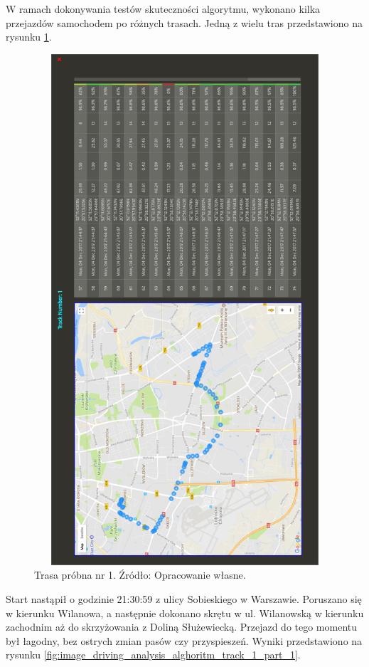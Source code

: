 W ramach dokonywania testów skuteczności algorytmu, wykonano kilka przejazdów samochodem po różnych trasach. Jedną z wielu tras przedstawiono na rysunku \ref{fig:image_driving_analysis_alghoritm_track_1}.

\begin{figure}[H]
	\centering
	\includegraphics[height=19cm, width=13cm]{img/driving_analysis/test_track_1.png}
	\caption{Trasa próbna nr 1. Źródło: Opracowanie własne.}
	\label{fig:image_driving_analysis_alghoritm_track_1}
\end{figure}

Start nastąpił o godzinie 21:30:59 z ulicy Sobieskiego w Warszawie. Poruszano się w kierunku Wilanowa, a następnie dokonano skrętu w ul. Wilanowską w kierunku zachodnim aż do skrzyżowania z Doliną Służewiecką. Przejazd do tego momentu był łagodny, bez ostrych zmian pasów czy przyspieszeń. Wyniki przedstawiono na rysunku \ref{fig:image_driving_analysis_alghoritm_track_1_part_1}.

